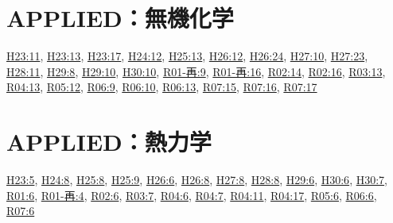 \section{APPLIED：無機化学}
\hyperref[q:h23-reg-applied-11]{H23:11}, \hyperref[q:h23-reg-applied-13]{H23:13}, \hyperref[q:h23-reg-applied-17]{H23:17}, \hyperref[q:h24-reg-applied-12]{H24:12}, \hyperref[q:h25-reg-applied-13]{H25:13}, \hyperref[q:h26-reg-applied-12]{H26:12}, \hyperref[q:h26-reg-applied-24]{H26:24}, \hyperref[q:h27-reg-applied-10]{H27:10}, \hyperref[q:h27-reg-applied-23]{H27:23}, \hyperref[q:h28-reg-applied-11]{H28:11}, \hyperref[q:h29-reg-applied-08]{H29:8}, \hyperref[q:h29-reg-applied-10]{H29:10}, \hyperref[q:h30-reg-applied-10]{H30:10}, \hyperref[q:r01-ret-applied-09]{R01-再:9}, \hyperref[q:r01-ret-applied-16]{R01-再:16}, \hyperref[q:r02-reg-applied-14]{R02:14}, \hyperref[q:r02-reg-applied-16]{R02:16}, \hyperref[q:r03-reg-applied-13]{R03:13}, \hyperref[q:r04-reg-applied-13]{R04:13}, \hyperref[q:r05-reg-applied-12]{R05:12}, \hyperref[q:r06-reg-applied-09]{R06:9}, \hyperref[q:r06-reg-applied-10]{R06:10}, \hyperref[q:r06-reg-applied-13]{R06:13}, \hyperref[q:r07-reg-applied-15]{R07:15}, \hyperref[q:r07-reg-applied-16]{R07:16}, \hyperref[q:r07-reg-applied-17]{R07:17}
\section{APPLIED：熱力学}
\hyperref[q:h23-reg-applied-05]{H23:5}, \hyperref[q:h24-reg-applied-08]{H24:8}, \hyperref[q:h25-reg-applied-08]{H25:8}, \hyperref[q:h25-reg-applied-09]{H25:9}, \hyperref[q:h26-reg-applied-06]{H26:6}, \hyperref[q:h26-reg-applied-08]{H26:8}, \hyperref[q:h27-reg-applied-08]{H27:8}, \hyperref[q:h28-reg-applied-08]{H28:8}, \hyperref[q:h29-reg-applied-06]{H29:6}, \hyperref[q:h30-reg-applied-06]{H30:6}, \hyperref[q:h30-reg-applied-07]{H30:7}, \hyperref[q:r01-reg-applied-06]{R01:6}, \hyperref[q:r01-ret-applied-04]{R01-再:4}, \hyperref[q:r02-reg-applied-06]{R02:6}, \hyperref[q:r03-reg-applied-07]{R03:7}, \hyperref[q:r04-reg-applied-06]{R04:6}, \hyperref[q:r04-reg-applied-07]{R04:7}, \hyperref[q:r04-reg-applied-11]{R04:11}, \hyperref[q:r04-reg-applied-17]{R04:17}, \hyperref[q:r05-reg-applied-06]{R05:6}, \hyperref[q:r06-reg-applied-06]{R06:6}, \hyperref[q:r07-reg-applied-06]{R07:6}
